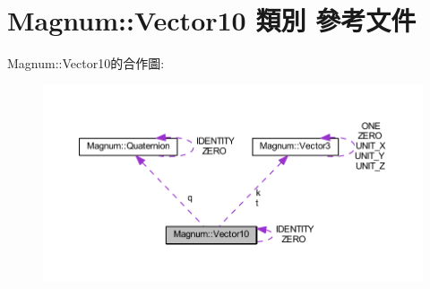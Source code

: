 \hypertarget{class_magnum_1_1_vector10}{}\section{Magnum\+:\+:Vector10 類別 參考文件}
\label{class_magnum_1_1_vector10}


Magnum\+:\+:Vector10的合作圖\+:\nopagebreak
\begin{figure}[H]
\begin{center}
\leavevmode
\includegraphics[width=350pt]{class_magnum_1_1_vector10__coll__graph}
\end{center}
\end{figure}
